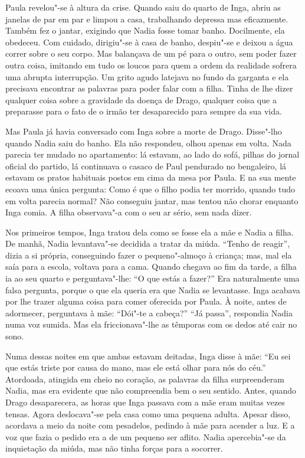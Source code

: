 Paula revelou"-se à altura da crise. Quando saiu do quarto de Inga, abriu
as janelas de par em par e limpou a casa, trabalhando depressa mas
eficazmente. Também fez o jantar, exigindo que Nadia fosse tomar banho.
Docilmente, ela obedeceu. Com cuidado, dirigiu"-se à casa de banho,
despiu"-se e deixou a água correr sobre o seu corpo. Mas balançava de um
pé para o outro, sem poder fazer outra coisa, imitando em tudo os loucos
para quem a ordem da realidade sofrera uma abrupta interrupção. Um grito
agudo latejava no fundo da garganta e ela precisava encontrar as
palavras para poder falar com a filha.
Tinha de lhe dizer qualquer coisa sobre a gravidade da doença de Drago,
qualquer coisa que a preparasse para o fato de o irmão ter desaparecido
para sempre da sua vida.

Mas Paula já havia conversado com Inga sobre a
morte de Drago. Disse"-lho quando Nadia saiu do banho. Ela não respondeu,
olhou apenas em volta. Nada parecia ter mudado no apartamento: lá
estavam, ao lado do sofá, pilhas do jornal oficial do partido, lá
continuava o casaco de Paul pendurado no bengaleiro, lá estavam os
pratos habituais postos em cima da mesa por Paula. E na sua mente ecoava
uma única pergunta: Como é que o filho podia ter morrido, quando tudo em
volta parecia normal? Não conseguiu jantar, mas tentou não chorar
enquanto Inga comia. A filha observava"-a com o seu ar sério, sem
nada dizer.

Nos primeiros tempos, Inga tratou dela como se fosse ela a mãe e Nadia a
filha. De manhã, Nadia levantava"-se decidida a tratar da miúda. ``Tenho
de reagir'', dizia a si própria, conseguindo fazer o pequeno"-almoço à
criança; mas, mal ela saía para a escola, voltava para a cama. Quando
chegava ao fim da tarde, a filha ia ao seu quarto e perguntava"-lhe: ``O
que estás a fazer?'' Era naturalmente uma falsa pergunta, porque o que
ela queria era que Nadia se levantasse. Inga acabava por lhe trazer
alguma coisa para comer oferecida por Paula. À noite, antes de adormecer, perguntava à mãe: ``Dói"-te a cabeça?'' ``Já passa'', respondia Nadia
numa voz sumida. Mas ela friccionava"-lhe as têmporas com os dedos até
cair no sono.

Numa dessas noites em que ambas estavam deitadas,
Inga disse à mãe: ``Eu sei que estás triste por causa do
mano, mas ele está olhar para nós do céu.'' Atordoada, atingida em cheio
no coração, as palavras da filha surpreenderam Nadia, mas era evidente
que não compreendia bem o seu sentido. Antes, quando Drago desaparecera,
as horas que Inga passava com a mãe eram muitas vezes tensas. Agora
deslocava"-se pela casa como uma pequena adulta. Apesar disso, acordava a
meio da noite com pesadelos, pedindo à mãe para acender a luz. E a voz
que fazia o pedido era a de um pequeno ser aflito. Nadia apercebia"-se da inquietação da miúda, mas não tinha forças para a socorrer.


